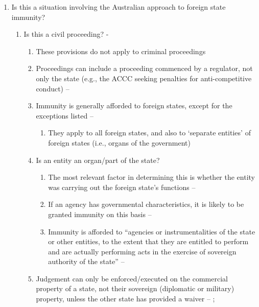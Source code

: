 \begin{enumerate}
\begin{enumerate}
\begin{enumerate}
        \end{enumerate}
    \end{enumerate}
    \item Is this a situation involving the Australian approach to foreign state immunity?
    \begin{enumerate}
        \item Is this a civil proceeding? - 
        \begin{enumerate}
            \item These provisions do not apply to criminal proceedings
            \item Proceedings can include a proceeding commenced by a regulator, not only the state (e.g., the ACCC seeking penalties for anti-competitive conduct) -- 
            \item Immunity is generally afforded to foreign states, except for the exceptions listed -- 
            \begin{enumerate}
                \item They apply to all foreign states, and also to `separate entities' of foreign states (i.e., organs of the government)
            \end{enumerate}
            \item Is an entity an organ/part of the state?
            \begin{enumerate}
                \item The most relevant factor in determining this is whether the entity was carrying out the foreign state's functions -- 
                \item If an agency has governmental characteristics, it is likely to be granted immunity on this basis -- 
                \item Immunity is afforded to ``agencies or instrumentalities of the state or other entities, to the extent that they are entitled to perform and are actually performing acts in the exercise of sovereign authority of the state'' -- 
            \end{enumerate}
            \item Judgement can only be enforced/executed on the commercial property of a state, not their sovereign (diplomatic or military) property, unless the other state has provided a waiver -- ; 

\end{enumerate}
\end{enumerate}
\end{enumerate}
